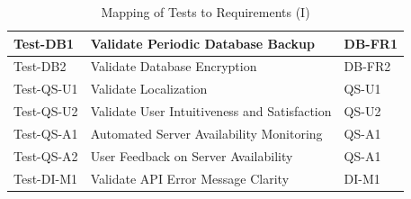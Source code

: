 \documentclass[12pt, titlepage]{article}
\begin{document}
\begin{table}[htpb!]
\begin{tabular}{|l|p{8cm}|p{3cm}|}
    \hline
    Test-DB1         & Validate Periodic Database Backup                  & DB-FR1                \\
    \hline
    Test-DB2         & Validate Database Encryption                       & DB-FR2                \\
    \hline
    Test-QS-U1       & Validate Localization                              & QS-U1                 \\
    \hline
    Test-QS-U2       & Validate User Intuitiveness and Satisfaction       & QS-U2                 \\
    \hline
    Test-QS-A1       & Automated Server Availability Monitoring           & QS-A1                 \\
    \hline
    Test-QS-A2       & User Feedback on Server Availability               & QS-A1                 \\
    \hline
    Test-DI-M1       & Validate API Error Message Clarity                 & DI-M1                 \\
    \hline
  \end{tabular}
  \caption{Mapping of Tests to Requirements (I)}
  \label{tab:test_requirements1}
\end{table}
\end{document}
